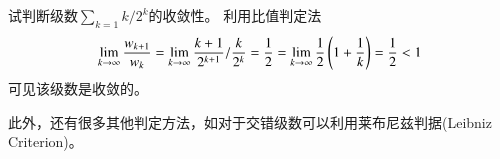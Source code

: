 \begin{examplebox}{试判断级数$\sum_{k=1} k/2^k$的收敛性。}
    利用比值判定法
    \[ 
        \lim_{k\to \infty} \frac{w_{k+1}}{w_k}=\lim_{k\to \infty} \frac{k+1}{2^{k+1}} / \frac{k}{2^{k}}=\frac{1}{2} 
        = \lim_{k\to \infty} \frac{1}{2}\left(1+\frac{1}{k}\right) 
        = \frac{1}{2} < 1
    \]
    可见该级数是收敛的。
\end{examplebox}

此外，还有很多其他判定方法，如对于交错级数可以利用莱布尼兹判据(Leibniz Criterion)。
